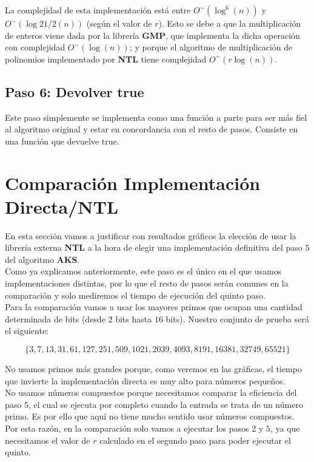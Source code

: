 La complejidad de esta implementación está entre $O^\sim(\log^6(n))$ y $O^\sim(\log{21/2}(n))$ (según el valor de $r$). Esto se debe a que la multiplicación de enteros viene dada por la librería \textbf{GMP}, que implementa la dicha operación con complejidad $O^\sim(\log(n))$; y porque el algoritmo de multiplicación de polinomios implementado por \textbf{NTL} tiene complejidad $O^\sim(r\log(n))$.

\subsection{Paso 6: Devolver true}

Este paso simplemente se implementa como una función a parte para ser más fiel al algoritmo original y estar en concordancia con el resto de pasos. Consiste en una función que devuelve true.

\section{Comparación Implementación Directa/NTL}

En esta sección vamos a justificar con resultados gráficos la elección de usar la librería externa \textbf{NTL} a la hora de elegir una implementación definitiva del paso $5$ del algoritmo \textbf{AKS}.\\

Como ya explicamos anteriormente, este paso es el único en el que usamos implementaciones distintas, por lo que el resto de pasos serán comunes en la comparación y solo mediremos el tiempo de ejecución del quinto paso.\\

Para la comparación vamos a usar los mayores primos que ocupan una cantidad determinada de bits (desde $2$ bits hasta $16$ bits). Nuestro conjunto de prueba será el siguiente:

\[ \{ 3, 7, 13, 31, 61, 127, 251, 509,
1021, 2039, 4093, 8191, 16381, 32749,
65521 \} \]

No usamos primos más grandes porque, como veremos en las gráficas, el tiempo que invierte la implementación directa es muy alto para números pequeños.\\

No usamos números compuestos porque necesitamos comparar la eficiencia del paso $5$, el cual se ejecuta por completo cuando la entrada se trata de un número primo. Es por ello que aquí no tiene mucho sentido usar números compuestos. Por esta razón, en la comparación solo vamos a ejecutar los pasos $2$ y $5$, ya que necesitamos el valor de $r$ calculado en el segundo paso para poder ejecutar el quinto.\\

